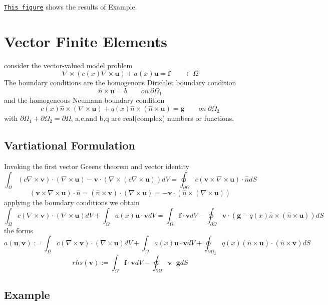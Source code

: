 \href{../../example1.tiff}{\tt This figure} shows the results of Example.\hypertarget{index_vectorFEM}{}\section{Vector Finite Elements}\label{index_vectorFEM}
consider the vector-\/valued model problem \[ \nabla \times (c(x) \nabla \times \mathbf{u}) +a(x) \mathbf{u} = \mathbf{f} \qquad \in \Omega \] The boundary conditions are the homogenous Dirichlet boundary condition \[ \hat{n} \times \mathbf{u} = b \qquad on \ \partial\Omega_1 \] and the homogeneous Neumann boundary condition \[ c(x)\hat{n}\times (\nabla \times \mathbf{u}) + q(x)\hat{n}\times (\hat{n}\times \mathbf{u}) = \mathbf{g} \qquad on \ \partial\Omega_2 \] with $\partial\Omega_1+\partial\Omega_2=\partial\Omega$, a,c,and b,q are real(complex) numbers or functions.\hypertarget{index_forms}{}\subsection{Vartiational Formulation}\label{index_forms}
Invoking the first vector Green\textquotesingle{}s theorem and vector identity \[ \int_\Omega (c\nabla \times \mathbf{v}) \cdot (\nabla \times \mathbf{u}) - \mathbf{v} \cdot (\nabla \times (c\nabla \times \mathbf{u})) dV = \oint_{\partial \Omega} c(\mathbf{v}\times \nabla \times \mathbf{u}) \cdot \hat{n} dS \] \[ (\mathbf{v}\times \nabla \times\mathbf{u}) \cdot \hat{n} = (\hat{n}\times \mathbf{v}) \cdot (\nabla \times \mathbf{u})=-\mathbf{v}\cdot (\hat{n} \times (\nabla \times \mathbf{u})) \] applying the boundary conditions we obtain \[ \int_\Omega c(\nabla \times \mathbf{v})\cdot(\nabla\times \mathbf{u})dV+\int_\Omega a(x)\mathbf{u}\cdot\mathbf{v} dV= \int_\Omega \mathbf{f}\cdot\mathbf{v}dV-\oint_{\partial \Omega}\mathbf{v}\cdot(\mathbf{g}-q(x)\hat{n}\times(\hat{n}\times\mathbf{u}))dS \] the forms \[ a(\mathbf{u},\mathbf{v}) := \int_\Omega c(\nabla \times \mathbf{v})\cdot(\nabla\times \mathbf{u})dV+\int_\Omega a(x)\mathbf{u}\cdot\mathbf{v} dV+\oint_{\partial\Omega_2}q(x)(\hat{n}\times\mathbf{u})\cdot(\hat{n}\times\mathbf{v})dS \] \[ rhs(\mathbf{v}) := \int_\Omega \mathbf{f}\cdot\mathbf{v}dV-\oint_{\partial \Omega}\mathbf{v}\cdot \mathbf{g}dS \]\hypertarget{index_exp}{}\subsection{Example}\label{index_exp}
